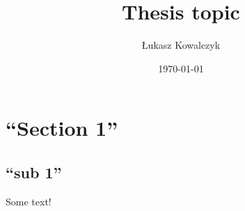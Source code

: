 \documentclass[12pt,a4paper,titlepage]{article}
\begin{document}
\title{Thesis topic}
\author{Łukasz Kowalczyk}
\date{\today}
\maketitle
\tableofcontents
\section{``Section 1''}
\subsection{``sub 1''}
Some text!
\end{document}

